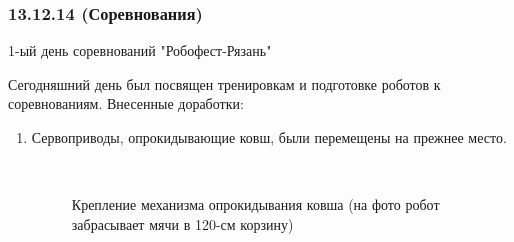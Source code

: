 \subsubsection{13.12.14 (Соревнования)}
\begin{center}
	1-ый день соревнований "Робофест-Рязань"
\end{center}
Сегодняшний день был посвящен тренировкам и подготовке роботов к соревнованиям.
Внесенные доработки:
\begin{enumerate}
	\item Сервоприводы, опрокидывающие ковш, были перемещены на прежнее место. 
	\begin{figure}[H]
		\begin{minipage}[h]{0.2\linewidth}
			\center  
		\end{minipage}
		\begin{minipage}[h]{0.6\linewidth}
			\caption{Крепление механизма опрокидывания ковша (на фото робот забрасывает мячи в 120-см корзину)}
		\end{minipage}
	\end{figure}
	

\end{enumerate}
